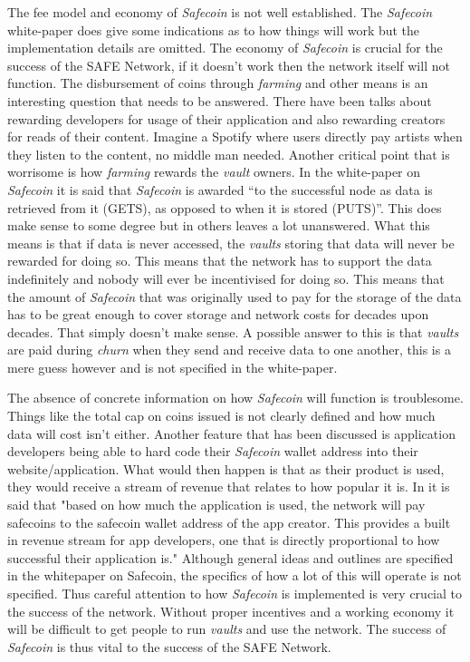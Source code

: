 The fee model and economy of \textit{Safecoin} is not well established. The \textit{Safecoin} white-paper\cite{lambert2015safecoin} does give some indications as to how things will work but the implementation details are omitted. The economy of \textit{Safecoin} is crucial for the success of the SAFE Network, if it doesn't work then the network itself will not function. The disbursement of coins through \textit{farming} and other means is an interesting question that needs to be answered. There have been talks about rewarding developers for usage of their application and also rewarding creators for reads of their content. Imagine a Spotify where users directly pay artists when they listen to the content, no middle man needed. Another critical point that is worrisome is how \textit{farming} rewards the \textit{vault} owners. In the white-paper on \textit{Safecoin} it is said that \textit{Safecoin} is awarded ``to the successful node as data is retrieved from it (GETS), as opposed to when it is stored (PUTS)''. This does make sense to some degree but in others leaves a lot unanswered. What this means is that if data is never accessed, the \textit{vaults} storing that data will never be rewarded for doing so. This means that the network has to support the data indefinitely and nobody will ever be incentivised for doing so. This means that  the amount of \textit{Safecoin} that was originally used to pay for the storage of the data has to be great enough to cover storage and network costs for decades upon decades. That simply doesn't make sense. A possible answer to this is that \textit{vaults} are paid during \textit{churn} when they send and receive data to one another, this is a mere guess however and is not specified in the white-paper.


The absence of concrete information on how \textit{Safecoin} will function is troublesome. Things like the total cap on coins issued is not clearly defined and how much data will cost isn't either. Another feature that has been discussed is application developers being able to hard code their \textit{Safecoin} wallet address into their website/application. What would then happen is that as their product is used, they would receive a stream of revenue that relates to how popular it is. In \cite{lambert2015safecoin} it is said that "based on how much the application is used, the network will pay safecoins to the safecoin wallet address of the app creator. This provides a built in revenue stream for app developers, one that is directly proportional to how successful their application is." Although general ideas and outlines are specified in the whitepaper on Safecoin, the specifics of how a lot of this will operate is not specified. Thus careful attention to how \textit{Safecoin} is implemented is very crucial to the success of the network. Without proper incentives and a working economy it will be difficult to get people to run \textit{vaults} and use the network. The success of \textit{Safecoin} is thus vital to the success of the SAFE Network.

